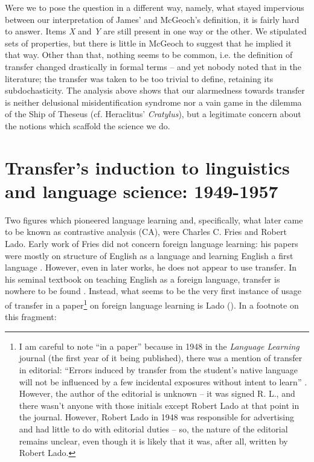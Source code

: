 \documentclass{article}
\begin{document}
Were we to pose the question in a different way, namely, what stayed impervious between our interpretation of James’ and McGeoch’s definition, it is fairly hard to answer. Items \textit{X} and \textit{Y} are still present in one way or the other. We stipulated sets of properties, but there is little in McGeoch to suggest that he implied it that way. Other than that, nothing seems to be common, i.e. the definition of transfer changed drastically in formal terms -- and yet nobody noted that in the literature; the transfer was taken to be too trivial to define, retaining its subdochasticity. The analysis above shows that our alarmedness towards transfer is neither delusional misidentification syndrome \citep[cf.][]{christodoulou_delusional_1991, feinberg_delusional_2005} nor a vain game in the dilemma of the Ship of Theseus (cf. Heraclitus' \textit{Cratylus}), but a legitimate concern about the notions which scaffold the science we do. 

\section{Transfer’s induction to linguistics and language science: 1949-1957}

Two figures which pioneered language learning and, specifically, what later came to be known as contrastive analysis (CA), were Charles C. Fries and Robert Lado. Early work of Fries did not concern foreign language learning: his papers were mostly on structure of English as a language and learning English a first language \citep[cf.][]{fries_periphrastic_1925, fries_meanings_1927, fries_rules_1927, fries_teaching_1927}. However, even in later works, he does not appear to use transfer. In his seminal textbook on teaching English as a foreign language, transfer is nowhere to be found \citep{fries_teaching_1945}.  Instead, what seems to be the very first instance of usage of transfer in a paper\footnote{I am careful to note ``in a paper'' because in 1948 in the \textit{Language Learning} journal (the first year of it being published), there was a mention of transfer in editorial: ``Errors induced by transfer from the student’s native language will not be influenced by a few incidental exposures without intent to learn'' \citep[][p. 3]{l_editorial_1948}. However, the author of the editorial is unknown -- it was signed R. L., and there wasn’t anyone with those initials except Robert Lado at that point in the journal. However, Robert Lado in 1948 was responsible for advertising and had little to do with editorial duties -- so, the nature of the editorial remains unclear, even though it is likely that it was, after all, written by Robert Lado.} on foreign language learning is Lado (\citeyear{lado_relation_1949}). In a footnote on this fragment:
\end{document}
